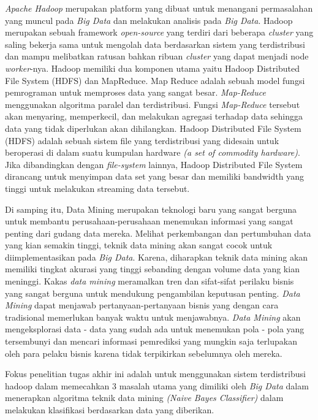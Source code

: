 \textit{Apache Hadoop} merupakan platform yang dibuat untuk menangani permasalahan yang muncul pada \textit{Big Data} dan melakukan analisis pada \textit{Big Data}. Hadoop merupakan sebuah framework \textit{open-source} yang terdiri dari beberapa \textit{cluster} yang saling bekerja sama untuk mengolah data berdasarkan sistem yang terdistribusi dan mampu melibatkan ratusan bahkan ribuan \textit{cluster} yang dapat menjadi node \textit{worker}-nya. Hadoop memiliki dua komponen utama yaitu Hadoop Distributed File System (HDFS) dan MapReduce. Map Reduce adalah sebuah model fungsi pemrograman untuk memproses data yang sangat besar.
\textit{Map-Reduce} menggunakan algoritma paralel dan terdistribusi. Fungsi \textit{Map-Reduce} tersebut akan menyaring, memperkecil, dan melakukan agregasi terhadap data sehingga data yang tidak diperlukan akan dihilangkan. Hadoop Distributed File System (HDFS) adalah sebuah sistem file yang terdistribusi yang didesain untuk beroperasi di dalam suatu kumpulan hardware \textit{(a set of commodity hardware)}. Jika dibandingkan dengan \textit{file-system} lainnya, Hadoop Distributed File System dirancang untuk menyimpan data set yang besar dan memiliki bandwidth yang tinggi untuk melakukan streaming data tersebut.


Di samping itu, Data Mining merupakan teknologi baru yang sangat berguna untuk membantu perusahaan-perusahaan menemukan informasi yang sangat penting dari gudang data mereka. Melihat perkembangan dan pertumbuhan data yang kian semakin tinggi, teknik data mining akan sangat cocok untuk diimplementasikan pada \textit{Big Data}. Karena, diharapkan teknik data mining akan memiliki tingkat akurasi yang tinggi sebanding dengan volume data yang kian meninggi. Kakas \textit{data mining} meramalkan tren dan sifat-sifat perilaku bisnis yang sangat berguna untuk mendukung pengambilan keputusan penting. \textit{Data Mining} dapat menjawab pertanyaan-pertanyaan bisnis yang dengan cara tradisional memerlukan banyak waktu untuk menjawabnya. \textit{Data Mining} akan mengeksplorasi data - data yang sudah ada untuk menemukan pola - pola yang tersembunyi dan mencari informasi pemrediksi yang mungkin saja terlupakan oleh para pelaku bisnis karena tidak terpikirkan sebelumnya oleh mereka.

Fokus penelitian tugas akhir ini adalah untuk menggunakan sistem terdistribusi hadoop dalam memecahkan 3 masalah utama yang dimiliki oleh \textit{Big Data} dalam menerapkan algoritma teknik data mining \textit{(Naive Bayes Classifier)} dalam melakukan klasifikasi berdasarkan data yang diberikan.

